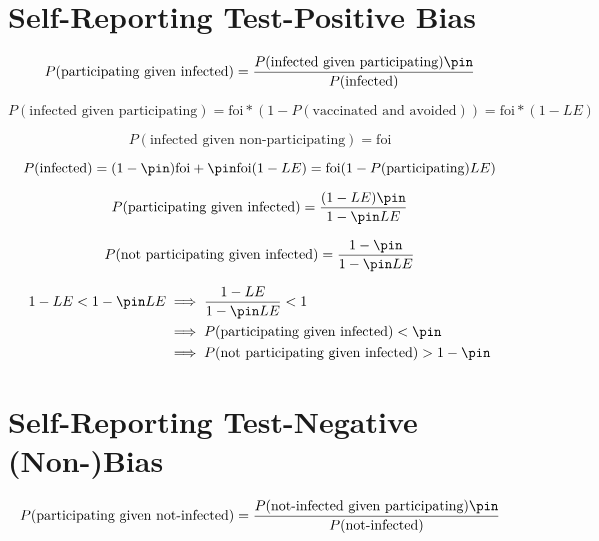 \documentclass{article}
\begin{document}
\section{Self-Reporting Test-Positive Bias}

\begin{equation*}
    P(\textrm{participating given infected}) = \frac{P(\textrm{infected given participating})\pin}{P(\textrm{infected})}
\end{equation*}

\begin{equation*}
    P(\textrm{infected given participating}) = \textrm{foi}*(1-P(\textrm{vaccinated and avoided})) = \textrm{foi}*(1-LE)
\end{equation*}

\begin{equation*}
    P(\textrm{infected given non-participating}) = \textrm{foi}
\end{equation*}

\begin{equation*}
    P(\textrm{infected}) = (1-\pin)\textrm{foi} + \pin\textrm{foi}(1-LE) = \textrm{foi}(1-P(\textrm{participating})LE)
\end{equation*}

\begin{equation*}
    P(\textrm{participating given infected}) = \frac{(1-LE)\pin}{1-\pin LE}
\end{equation*}

\begin{equation*}
    P(\textrm{not participating given infected}) = \frac{1-\pin}{1-\pin LE}
\end{equation*}

\begin{equation*}\begin{aligned}
    1-LE < 1-\pin LE &\implies \frac{1-LE}{1-\pin LE} < 1\\
    & \implies P(\textrm{participating given infected}) < \pin \\
    & \implies P(\textrm{not participating given infected}) > 1-\pin
\end{aligned}\end{equation*}

\section{Self-Reporting Test-Negative (Non-)Bias}

\begin{equation*}
    P(\textrm{participating given not-infected}) = \frac{P(\textrm{not-infected given participating})\pin}{P(\textrm{not-infected})}
\end{equation*}
\end{document}

